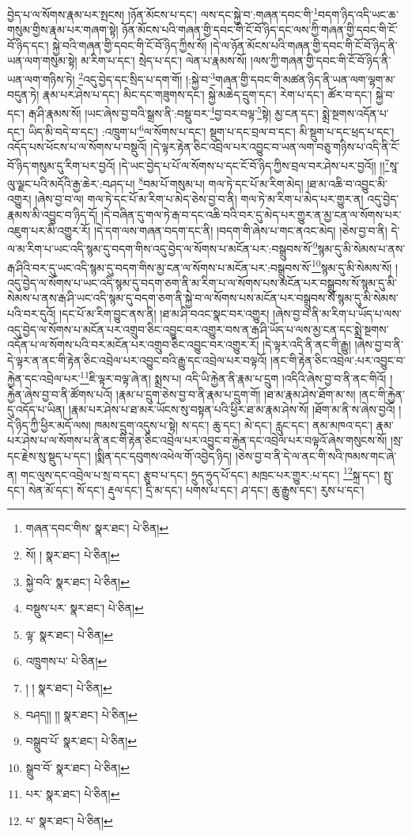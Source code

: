བྱེད་པ་ལ་སོགས་རྣམ་པར་སྤངས། །ཉོན་མོངས་པ་དང་། ལས་དང་སྐྱེ་བ་:གཞན་དབང་གི་\footnote{གཞན་དབང་གིས་  སྣར་ཐང་།  པེ་ཅིན། }བདག་ཉིད་འདི་ཡང་ཆ་གསུམ་གྱིས་རྣམ་པར་གཞག་སྟེ། ཉོན་མོངས་པའི་གཞན་གྱི་དབང་གི་ངོ་བོ་ཉིད་དང་ལས་ཀྱི་གཞན་གྱི་དབང་གི་ངོ་བོ་ཉིད་དང་། སྐྱེ་བའི་གཞན་གྱི་དབང་གི་ངོ་བོ་ཉིད་ཀྱིས་སོ། །དེ་ལ་ཉོན་མོངས་པའི་གཞན་གྱི་དབང་གི་ངོ་བོ་ཉིད་ནི་ཡན་ལག་གསུམ་སྟེ། མ་རིག་པ་དང་། སྲེད་པ་དང་། ལེན་པ་རྣམས་སོ། །ལས་ཀྱི་གཞན་གྱི་དབང་གི་ངོ་བོ་ཉིད་ནི་ཡན་ལག་གཉིས་ཏེ། \footnote{སོ། །   སྣར་ཐང་།  པེ་ཅིན། }འདུ་བྱེད་དང་སྲིད་པ་དག་གོ། །:སྐྱེ་བ་\footnote{སྐྱེ་བའི་  སྣར་ཐང་།  པེ་ཅིན། }གཞན་གྱི་དབང་གི་མཚན་ཉིད་ནི་ཡན་ལག་ལྷག་མ་བདུན་ཏེ། རྣམ་པར་ཤེས་པ་དང་། མིང་དང་གཟུགས་དང་། སྐྱེ་མཆེད་དྲུག་དང་། རེག་པ་དང་། ཚོར་བ་དང་། སྐྱེ་བ་དང་། རྒ་ཤི་རྣམས་སོ། །ཡང་ཞེས་བྱ་བའི་སྒྲས་ནི་:བསྡུ་བར་\footnote{བསྡུས་པར་  སྣར་ཐང་།  པེ་ཅིན། }བྱ་བར་བལྟ་\footnote{ལྟ་  སྣར་ཐང་།  པེ་ཅིན། }སྟེ། མྱ་ངན་དང་། སྨྲེ་སྔགས་འདོན་པ་དང་། ཡིད་མི་བདེ་བ་དང་། :འཁྲུག་པ་\footnote{འཁྲུགས་པ་  པེ་ཅིན། }ལ་སོགས་པ་དང་། སྡུག་པ་དང་བྲལ་བ་དང་། མི་སྡུག་པ་དང་ཕྲད་པ་དང་། འདོད་པས་ཕོངས་པ་ལ་སོགས་པ་བསྡུའོ། །དེ་ལྟར་རྟེན་ཅིང་འབྲེལ་པར་འབྱུང་བ་ཡན་ལག་བཅུ་གཉིས་པ་འདི་ནི་ངོ་བོ་ཉིད་གསུམ་དུ་རིག་པར་བྱའོ། །དེ་ཡང་བྱེད་པ་པོ་ལ་སོགས་པ་དང་ངོ་བོ་ཉིད་ཀྱིས་བྲལ་བར་ཤེས་པར་བྱའོ།། །།\footnote{། །  སྣར་ཐང་།  པེ་ཅིན། }སཱ་ལུ་ལྗང་པའི་མདོའི་རྒྱ་ཆེར་:བཤད་པ། \footnote{བཤད།། །།  སྣར་ཐང་།  པེ་ཅིན། }བམ་པོ་གསུམ་པ། གལ་ཏེ་དང་པོ་མ་རིག་མེད། །ཐ་མ་འཆི་བ་འབྱུང་མི་འགྱུར། །ཞེས་བྱ་བ་ལ། གལ་ཏེ་དང་པོ་མ་རིག་པ་མེད་ཅེས་བྱ་བ་ནི། གལ་ཏེ་མ་རིག་པ་མེད་པར་གྱུར་ན། འདུ་བྱེད་རྣམས་མི་འབྱུང་བ་ཉིད་དོ། །དེ་བཞིན་དུ་གལ་ཏེ་རྒ་བ་དང་འཆི་བའི་བར་དུ་མེད་པར་གྱུར་ན་མྱ་ངན་ལ་སོགས་པར་འཇུག་པར་མི་འགྱུར་རོ། །དེ་དག་ལས་གཞན་བདག་དང་ནི། །བདག་གི་ཞེས་པ་གང་ནའང་མེད། །ཅེས་བྱ་བ་ནི། དེ་ལ་མ་རིག་པ་ཡང་འདི་སྙམ་དུ་བདག་གིས་འདུ་བྱེད་ལ་སོགས་པ་མངོན་པར་:བསྒྲུབས་སོ་\footnote{བསྒྲུབ་པོ་  སྣར་ཐང་།  པེ་ཅིན། }སྙམ་དུ་མི་སེམས་པ་ནས་རྒ་ཤིའི་བར་དུ་ཡང་འདི་སྙམ་དུ་བདག་གིས་མྱ་ངན་ལ་སོགས་པ་མངོན་པར་:བསྒྲུབས་སོ་\footnote{སྒྲུབ་བོ་  སྣར་ཐང་།  པེ་ཅིན། }སྙམ་དུ་མི་སེམས་སོ། །འདུ་བྱེད་ལ་སོགས་པ་ཡང་འདི་སྙམ་དུ་བདག་ཅག་ནི་མ་རིག་པ་ལ་སོགས་པས་མངོན་པར་བསྒྲུབས་སོ་སྙམ་དུ་མི་སེམས་པ་ནས་རྒ་ཤི་ཡང་འདི་སྙམ་དུ་བདག་ཅག་ནི་སྐྱེ་བ་ལ་སོགས་པས་མངོན་པར་བསྒྲུབས་སོ་སྙམ་དུ་མི་སེམས་པའི་བར་དུའོ། །དང་པོ་མ་རིག་བྱུང་ནས་ནི། །ཐ་མ་ཤི་བའང་སྣང་བར་འགྱུར། །ཞེས་བྱ་བ་ནི་མ་རིག་པ་ཡོད་པ་ལས་འདུ་བྱེད་ལ་སོགས་པ་མངོན་པར་འགྲུབ་ཅིང་འབྱུང་བར་འགྱུར་བས་ན་རྒ་ཤི་ཡོད་པ་ལས་མྱ་ངན་དང་སྨྲེ་སྔགས་འདོན་པ་ལ་སོགས་པའི་བར་མངོན་པར་འགྲུབ་ཅིང་འབྱུང་བར་འགྱུར་རོ། །དེ་ལྟར་འདི་ནི་ནང་གི་རྒྱུ། །ཞེས་བྱ་བ་ནི་དེ་ལྟར་ན་ནང་གི་རྟེན་ཅིང་འབྲེལ་པར་འབྱུང་བའི་རྒྱུ་དང་འབྲེལ་པར་བལྟའོ། །ནང་གི་རྟེན་ཅིང་འབྲེལ་:པར་འབྱུང་བ་རྐྱེན་དང་འབྲེལ་པར་\footnote{པར་  སྣར་ཐང་།  པེ་ཅིན། }ཇི་ལྟར་བལྟ་ཞེ་ན། སྨྲས་པ། འདི་ཡི་རྐྱེན་ནི་རྣམ་པ་དྲུག །འདིའི་ཞེས་བྱ་བ་ནི་ནང་གིའོ། །རྐྱེན་ཞེས་བྱ་བ་ནི་ཚོགས་པའོ། །རྣམ་པ་དྲུག་ཅེས་བྱ་བ་ནི་རྣམ་པ་དྲུག་གོ། །ཐ་མ་རྣམ་ཤེས་ཐོག་མ་ས། །ནང་གི་རྐྱེན་དུ་འདོད་པ་ཡིན། །རྣམ་པར་ཤེས་པ་ཐ་མར་ཡོངས་སུ་བསྟན་པའི་ཕྱིར་ཐ་མ་རྣམ་ཤེས་སོ། །ཐོག་མ་ནི་ས་ཞེས་བྱའོ། །དེ་ཉིད་ཀྱི་ཕྱིར་མདོ་ལས། ཁམས་དྲུག་འདུས་པ་སྟེ། ས་དང་། ཆུ་དང་། མེ་དང་། རླུང་དང་། ནམ་མཁའ་དང་། རྣམ་པར་ཤེས་པ་ལ་སོགས་པ་ནི་ནང་གི་རྟེན་ཅིང་འབྲེལ་པར་འབྱུང་བ་རྐྱེན་དང་འབྲེལ་པར་བལྟའོ་ཞེས་གསུངས་སོ། །སྲ་དང་རྗེས་སུ་སྡུད་པ་དང་། །སྨིན་དང་དབུགས་འཕེལ་གོ་འབྱེད་ཉིད། །ཅེས་བྱ་བ་ནི་དེ་ལ་ནང་གི་སའི་ཁམས་གང་ཞེ་ན། གང་ལུས་དང་འབྲེལ་པ་སྲ་བ་དང་། རྩུབ་པ་དང་། ཧྲུད་ཧྲུད་པོ་དང་། མཁྲང་པར་གྱུར་:པ་དང་། \footnote{པ་  སྣར་ཐང་།  པེ་ཅིན། }སྐྲ་དང་། སྤུ་དང་། སེན་མོ་དང་། སོ་དང་། རྡུལ་དང་། དྲི་མ་དང་། པགས་པ་དང་། ཤ་དང་། ཆུ་རྒྱུས་དང་། རུས་པ་དང་། 